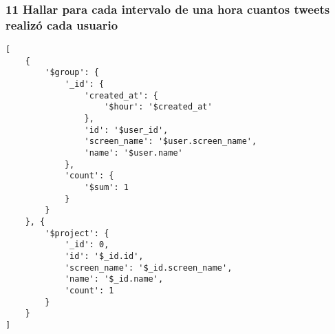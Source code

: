 \subsubsection*{11 Hallar para cada intervalo de una hora cuantos tweets realizó cada usuario}

\begin{verbatim}
[
    {
        '$group': {
            '_id': {
                'created_at': {
                    '$hour': '$created_at'
                }, 
                'id': '$user_id', 
                'screen_name': '$user.screen_name', 
                'name': '$user.name'
            }, 
            'count': {
                '$sum': 1
            }
        }
    }, {
        '$project': {
            '_id': 0, 
            'id': '$_id.id', 
            'screen_name': '$_id.screen_name', 
            'name': '$_id.name', 
            'count': 1
        }
    }
]

\end{verbatim}



\newpage